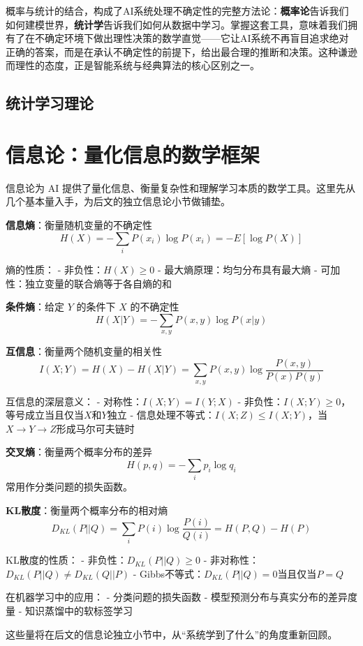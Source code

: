 概率与统计的结合，构成了AI系统处理不确定性的完整方法论：\textbf{概率论}告诉我们如何建模世界，\textbf{统计学}告诉我们如何从数据中学习。掌握这套工具，意味着我们拥有了在不确定环境下做出理性决策的数学直觉——它让AI系统不再盲目追求绝对正确的答案，而是在承认不确定性的前提下，给出最合理的推断和决策。这种谦逊而理性的态度，正是智能系统与经典算法的核心区别之一。

\subsection{统计学习理论}


 \section{信息论：量化信息的数学框架}
 
信息论为 AI 提供了量化信息、衡量复杂性和理解学习本质的数学工具。这里先从几个基本量入手，为后文的独立信息论小节做铺垫。

\textbf{信息熵}：衡量随机变量的不确定性
$$H(X) = -\sum_{i} P(x_i) \log P(x_i) = -E[\log P(X)]$$

熵的性质：
- 非负性：$H(X) \geq 0$
- 最大熵原理：均匀分布具有最大熵
- 可加性：独立变量的联合熵等于各自熵的和

\textbf{条件熵}：给定 $Y$ 的条件下 $X$ 的不确定性
$$H(X|Y) = -\sum_{x,y} P(x,y) \log P(x|y)$$

\textbf{互信息}：衡量两个随机变量的相关性
$$I(X;Y) = H(X) - H(X|Y) = \sum_{x,y} P(x,y) \log \frac{P(x,y)}{P(x)P(y)}$$

互信息的深层意义：
- 对称性：$I(X;Y) = I(Y;X)$
- 非负性：$I(X;Y) \geq 0$，等号成立当且仅当$X$和$Y$独立
- 信息处理不等式：$I(X;Z) \leq I(X;Y)$，当$X \to Y \to Z$形成马尔可夫链时

\textbf{交叉熵}：衡量两个概率分布的差异
$$H(p,q) = -\sum_{i} p_i \log q_i$$
常用作分类问题的损失函数。

\textbf{KL散度}：衡量两个概率分布的相对熵
$$D_{KL}(P||Q) = \sum_{i} P(i) \log \frac{P(i)}{Q(i)} = H(P,Q) - H(P)$$

KL散度的性质：
- 非负性：$D_{KL}(P||Q) \geq 0$
- 非对称性：$D_{KL}(P||Q) \neq D_{KL}(Q||P)$
- Gibbs不等式：$D_{KL}(P||Q) = 0$当且仅当$P = Q$

在机器学习中的应用：
- 分类问题的损失函数
- 模型预测分布与真实分布的差异度量
- 知识蒸馏中的软标签学习

这些量将在后文的信息论独立小节中，从“系统学到了什么”的角度重新回顾。


